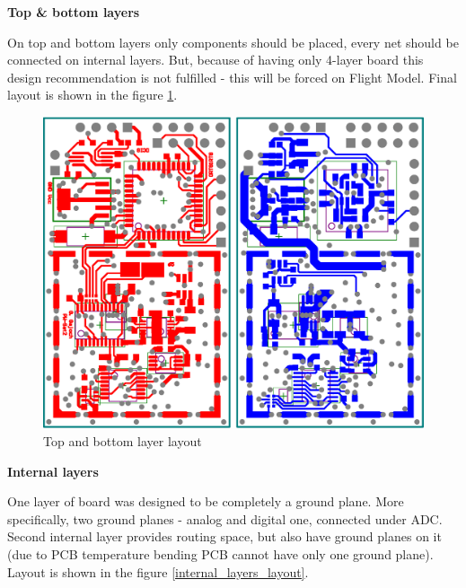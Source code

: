        \bigskip \textbf{Top \& bottom layers}

        On top and bottom layers only components should be placed, every net should be connected on internal layers. But, because of having only 4-layer board this design recommendation is not fulfilled - this will be forced on Flight Model. Final layout is shown in the figure \ref{top_bottom_layer_layout}.

        \begin{figure}[H]
            \centering
            \includegraphics[width=0.5\paperwidth]{img/06/top_bottom_layer_layout.eps}
            \caption{Top and bottom layer layout}
            \label{top_bottom_layer_layout}
        \end{figure}

        \bigskip \textbf{Internal layers}

        One layer of board was designed to be completely a ground plane. More specifically, two ground planes - analog and digital one, connected under ADC. Second internal layer provides routing space, but also have ground planes on it (due to PCB temperature bending PCB cannot have only one ground plane). Layout is shown in the figure \ref{internal_layers_layout}.

